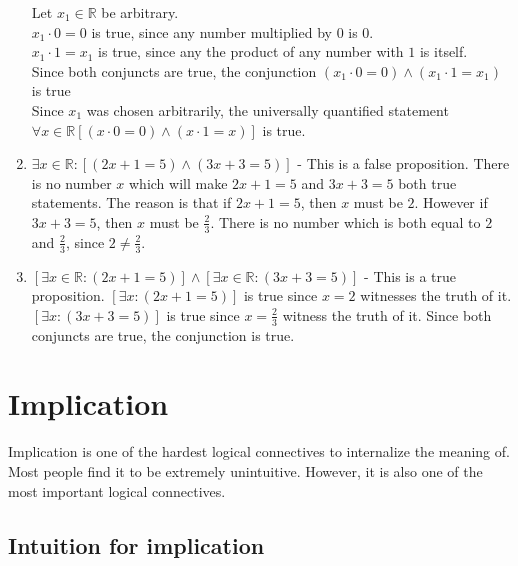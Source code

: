\begin{solutions}
\begin{enumerate}
		\begin{fitch*}
			\textrm{Let $x_1  \in \mathbb{R}$ be arbitrary.}\\
			\textrm{$x_1 \cdot 0 = 0$ is true, since any number multiplied by $0$ is $0$. }\\
			\textrm{$x_1 \cdot 1 = x_1$ is true, since any the product of any number with $1$ is  itself.}\\
			\textrm{Since both conjuncts are true, the conjunction $(x_1 \cdot 0 = 0) \wedge (x_1 \cdot 1 = x_1)$ is true}\\
			\textrm{Since $x_1$ was chosen arbitrarily, the universally quantified statement}\\
			 \textrm{ \hphantom{dsada} $\forall x \in \mathbb{R} [(x \cdot 0 = 0) \wedge (x \cdot 1 = x) ]$ is true.} 
			\end{fitch*}
		\item $\exists x \in \mathbb{R}: [(2x+1 = 5) \wedge (3x+3 = 5)]$ - This is a false proposition.  There is no number $x$ which will make $2x+1 = 5$ and $3x+3 = 5$ both true statements.  The reason is that if $2x+1  = 5$, then $x$ must be $2$.   However if $3x+3 = 5$, then $x$ must be $\frac{2}{3}$.  There is no number which is both equal to $2$ and $\frac{2}{3}$, since $2 \neq \frac{2}{3}$.
		\item $[\exists x \in \mathbb{R}: (2x+1 = 5)] \wedge [\exists x \in \mathbb{R}: (3x+3 = 5)]$ - This is a true proposition. $[\exists x: (2x+1 = 5)] $ is true since $x=2$ witnesses the truth of it.   $[\exists x: (3x+3 = 5)]$ is true since $x= \frac{2}{3}$ witness the truth of it. Since both conjuncts are true, the conjunction is true.
	\end{enumerate}



\end{solutions}


\section{Implication}

Implication is one of the hardest logical connectives to internalize the meaning of.  Most people find it to be extremely unintuitive. However, it is also one of the most important logical connectives.

\subsection{Intuition for implication}

